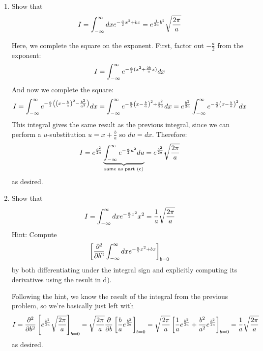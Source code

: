 \documentclass[10pt]{article}
\begin{document}
\begin{enumerate}[label=\alph*)]
\begin{solution}
			\end{solution}
		\item Show that
			\[
				I = \int_{-\infty}^{\infty} dx e^{-\frac{a}{2}x^2 + bx}  = e^{\frac{1}{2a}b^2}\sqrt{\frac{2\pi}{a}} 
			\] 
			\begin{solution}
				Here, we complete the square on the exponent. First, factor out $-\frac{a}{2}$ from the 
				exponent:
				\[
					I = \int_{-\infty}^{\infty} e^{-\frac{a}{2}(x^2 + \frac{2b}{a}x)} dx
				\] 
				And now we complete the square:
				\[
					I = \int_{-\infty}^{\infty} e^{-\frac{a}{2}\left(\left(x - \frac{b}{a}\right)^2 - \frac{b^2}{a^2}\right)} dx
					= \int_{-\infty}^{\infty} e^{-\frac{a}{2}\left( x - \frac{b}{a} \right)^2 + \frac{b^2}{2a}} dx = e^{\frac{b^2}{2a}}
					\int_{-\infty}^{\infty} e^{-\frac{a}{2}\left( x - \frac{b}{a} \right)^2} dx
				\] 
				This integral gives the same result as the previous integral, since we can perform a 
				$u$-substitution $u = x + \frac{b}{a}$ so $du = dx$. Therefore:
				\[
					I = e^{\frac{b^2}{2a}} \underbrace{\int_{-\infty}^{\infty} e^{-\frac{a}{2}u^2} du}_{\text{same as part (c)}}
					= e^{\frac{b^2}{2a}} \sqrt{\frac{2\pi}{a}} 
				\] 
				as desired.
			\end{solution}
		\item Show that
			\[
				I = \int_{-\infty}^{\infty} dx e^{-\frac{a}{2}x^2} x^2 = \frac{1}{a}\sqrt{\frac{2\pi}{a}} 
			\] 
			Hint: Compute
			\[
				\left[\pdv[2]{b} \int_{-\infty}^{\infty} dx e^{-\frac{a}{2}x^2 + bx}\right]_{b = 0}
			\] 
			by both differentiating under the integral sign and explicitly computing its derivatives using 
			the result in d).

			\begin{solution}
				Following the hint, we know the result of the integral from the previous problem, so we're 
				basically just left with 
				\[
					I = \pdv[2]{b}\left[ e^{\frac{b^2}{2a}}\sqrt{\frac{2\pi}{a}}\right]_{b = 0} 
					= \sqrt{\frac{2\pi}{a}} \pdv{b}\left[\frac{b}{a}e^{\frac{b^2}{2a}}\right]_{b =0} 
					= \sqrt{\frac{2\pi}{a}} \left[ \frac{1}{a}e^{\frac{b^2}{2a}} + \frac{b^2}{a^2}e^{\frac{b^2}{2a}}\right]_{b =0}
						= \frac{1}{a}\sqrt{\frac{2\pi}{a}} 
				\] 
				as desired. 
			\end{solution}
	\end{enumerate}
	\pagebreak
\end{document}
